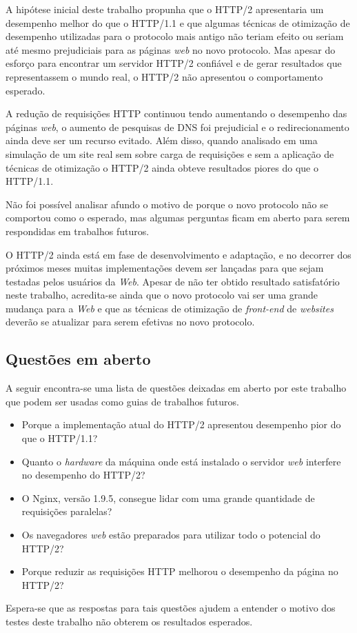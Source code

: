 A hipótese inicial deste trabalho propunha que o HTTP/2 apresentaria um desempenho melhor do que o HTTP/1.1 e que algumas técnicas de otimização de desempenho utilizadas para o protocolo mais antigo não teriam efeito ou seriam até mesmo prejudiciais para as páginas \textit{web} no novo protocolo. Mas apesar do esforço para encontrar um servidor HTTP/2 confiável e de gerar resultados que representassem o mundo real, o HTTP/2 não apresentou o comportamento esperado.

A redução de requisições HTTP continuou tendo aumentando o desempenho das páginas \textit{web}, o aumento de pesquisas de DNS foi prejudicial e o redirecionamento ainda deve ser um recurso evitado. Além disso, quando analisado em uma simulação de um site real sem sobre carga de requisições e sem a aplicação de técnicas de otimização o HTTP/2 ainda obteve resultados piores do que o HTTP/1.1.

Não foi possível analisar afundo o motivo de porque o novo protocolo não se comportou como o esperado, mas algumas perguntas ficam em aberto para serem respondidas em trabalhos futuros.

O HTTP/2 ainda está em fase de desenvolvimento e adaptação, e no decorrer dos próximos meses muitas implementações devem ser lançadas para que sejam testadas pelos usuários da \textit{Web}. Apesar de não ter obtido resultado satisfatório neste trabalho, acredita-se ainda que o novo protocolo vai ser uma grande mudança para a \textit{Web} e que as técnicas de otimização de \textit{front-end} de \textit{websites} deverão se atualizar para serem efetivas no novo protocolo.

\subsection{Questões em aberto}
\label{questoesemaberto}

A seguir encontra-se uma lista de questões deixadas em aberto por este trabalho que podem ser usadas como guias de trabalhos futuros.

\begin{itemize}
	\item Porque a implementação atual do HTTP/2 apresentou desempenho pior do que o HTTP/1.1?
	\item Quanto o \textit{hardware} da máquina onde está instalado o servidor \textit{web} interfere no desempenho do HTTP/2?
	\item O Nginx, versão 1.9.5, consegue lidar com uma grande quantidade de requisições paralelas?
	\item Os navegadores \textit{web} estão preparados para utilizar todo o potencial do HTTP/2?
	\item Porque reduzir as requisições HTTP melhorou o desempenho da página no HTTP/2?
\end{itemize}

Espera-se que as respostas para tais questões ajudem a entender o motivo dos testes deste trabalho não obterem os resultados esperados.